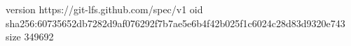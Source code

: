 version https://git-lfs.github.com/spec/v1
oid sha256:60735652db7282d9af076292f7b7ae5e6b4f42b025f1c6024c28d83d9320e743
size 349692
